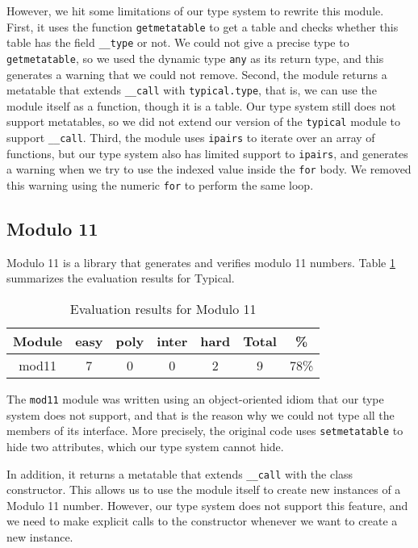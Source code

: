 However, we hit some limitations of our type system to rewrite this module.
First, it uses the function \texttt{getmetatable} to get a table and
checks whether this table has the field \texttt{\string_\string_type} or not.
We could not give a precise type to \texttt{getmetatable}, so we used the dynamic
type \texttt{any} as its return type, and this generates a warning that we could not
remove.
Second, the module returns a metatable that extends \texttt{\string_\string_call}
with \texttt{typical.type}, that is, we can use the module itself as a function,
though it is a table.
Our type system still does not support metatables, so we did not extend our version
of the \texttt{typical} module to support \texttt{\string_\string_call}.
Third, the module uses \texttt{ipairs} to iterate over an array of functions,
but our type system also has limited support to \texttt{ipairs}, and generates
a warning when we try to use the indexed value inside the \texttt{for} body.
We removed this warning using the numeric \texttt{for} to perform the same loop.

\subsection{Modulo 11}

Modulo 11 is a library that generates and verifies modulo 11 numbers.
Table \ref{tab:evalmod11} summarizes the evaluation results for Typical.

\begin{table}[!ht]
\begin{center}
\begin{tabular}{|c|c|c|c|c|c|c|}
\hline
\textbf{Module} & \textbf{easy} & \textbf{poly} & \textbf{inter} & \textbf{hard} & \textbf{Total} & \textbf{\%} \\
\hline
mod11 & 7 & 0 & 0 & 2 & 9 & 78\% \\
\hline
\end{tabular}
\end{center}
\caption{Evaluation results for Modulo 11}
\label{tab:evalmod11}
\end{table}

The \texttt{mod11} module was written using an object-oriented idiom that
our type system does not support, and that is the reason why we could not
type all the members of its interface.
More precisely, the original code uses \texttt{setmetatable} to hide
two attributes, which our type system cannot hide.

In addition, it returns a metatable that extends \texttt{\string_\string_call}
with the class constructor.
This allows us to use the module itself to create new instances of a
Modulo 11 number.
However, our type system does not support this feature, and we need to
make explicit calls to the constructor whenever we want to create a
new instance.

